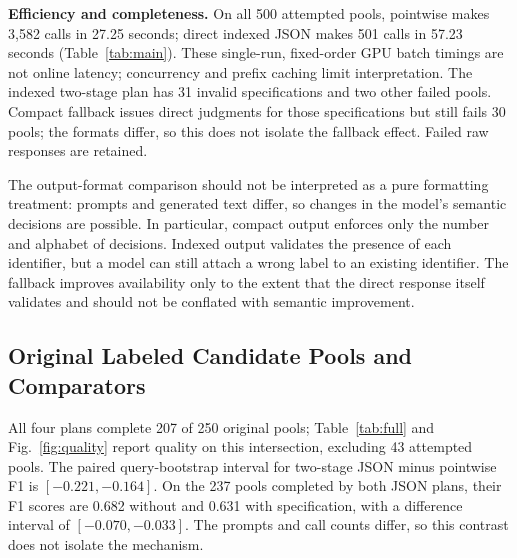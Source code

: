 \documentclass[conference]{IEEEtran}
\begin{document}
\textbf{Efficiency and completeness.}
On all 500 attempted pools, pointwise makes 3,582 calls in 27.25 seconds; direct indexed JSON makes 501 calls in 57.23 seconds (Table~\ref{tab:main}). These single-run, fixed-order GPU batch timings are not online latency; concurrency and prefix caching limit interpretation. The indexed two-stage plan has 31 invalid specifications and two other failed pools. Compact fallback issues direct judgments for those specifications but still fails 30 pools; the formats differ, so this does not isolate the fallback effect. Failed raw responses are retained.

The output-format comparison should not be interpreted as a pure formatting treatment: prompts and generated text differ, so changes in the model's semantic decisions are possible. In particular, compact output enforces only the number and alphabet of decisions. Indexed output validates the presence of each identifier, but a model can still attach a wrong label to an existing identifier. The fallback improves availability only to the extent that the direct response itself validates and should not be conflated with semantic improvement.

\subsection{Original Labeled Candidate Pools and Comparators}
All four plans complete 207 of 250 original pools; Table~\ref{tab:full} and Fig.~\ref{fig:quality} report quality on this intersection, excluding 43 attempted pools. The paired query-bootstrap interval for two-stage JSON minus pointwise F1 is $[-0.221,-0.164]$. On the 237 pools completed by both JSON plans, their F1 scores are 0.682 without and 0.631 with specification, with a difference interval of $[-0.070,-0.033]$. The prompts and call counts differ, so this contrast does not isolate the mechanism.
\end{document}
